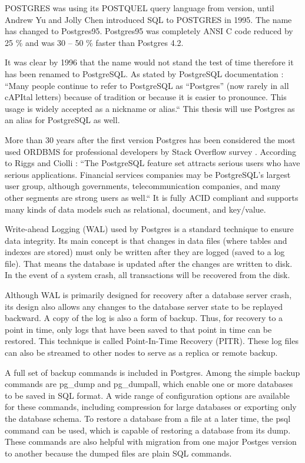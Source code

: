 POSTGRES was using its POSTQUEL query language from version, until Andrew Yu and Jolly Chen introduced SQL to POSTGRES in 1995. The name has changed to Postgres95. Postgres95 was completely ANSI C code reduced by 25 \% and was 30 – 50 \% faster than Postgres 4.2.  \cite{docuPgBriefHistory}

It was clear by 1996 that the name would not stand the test of time therefore it has been renamed to PostgreSQL. As stated by PostgreSQL documentation \cite{docuPgBriefHistory}: “Many people continue to refer to PostgreSQL as “Postgres” (now rarely in all cAPItal letters) because of tradition or because it is easier to pronounce. This usage is widely accepted as a nickname or alias.“ This thesis will use Postgres as an alias for PostgreSQL as well.

More than 30 years after the first version Postgres has been considered the most used ORDBMS for professional developers by Stack Overflow survey \cite{so2022survey}. According to Riggs and Ciolli \cite{pg14introduction}: “The PostgreSQL feature set attracts serious users who have serious applications. Financial services companies may be PostgreSQL's largest user group, although governments, telecommunication companies, and many other segments are strong users as well.“ It is fully ACID compliant \cite{juba2015learningTransactionIsolation} and supports many kinds of data models such as relational, document, and key/value. \cite{pg14introduction}

Write-ahead Logging (WAL) used by Postgres is a standard technique to ensure data integrity. Its main concept is that changes in data files (where tables and indexes are stored) must only be written after they are logged (saved to a log file). That means the database is updated after the changes are written to disk. In the event of a system crash, all transactions will be recovered from the disk. \cite{docuPgWal}

Although WAL is primarily designed for recovery after a database server crash, its design also allows any changes to the database server state to be replayed backward. A copy of the log is also a form of backup. Thus, for recovery to a point in time, only logs that have been saved to that point in time can be restored. This technique is called Point-In-Time Recovery (PITR). \cite{DocuPgPITR} These log files can also be streamed to other nodes to serve as a replica or remote backup. \cite{pg14replication}

A full set of backup commands is included in Postgres. Among the simple backup commands are pg\_dump and pg\_dumpall, which enable one or more databases to be saved in SQL format. A wide range of configuration options are available for these commands, including compression for large databases or exporting only the database schema. To restore a database from a file at a later time, the psql command can be used, which is capable of restoring a database from its dump. \cite{DocuPgDump} These commands are also helpful with migration from one major Postges version to another because the dumped files are plain SQL commands.

